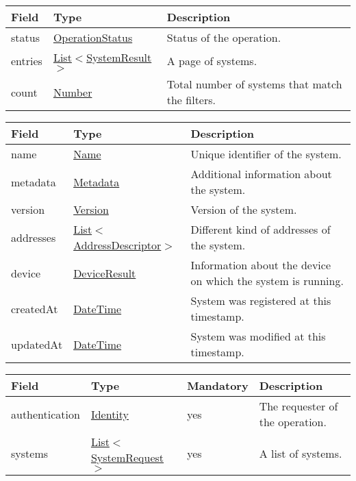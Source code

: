 \documentclass[a4paper]{arrowhead}
\newcommand{\pref}[1]{{\textcolor{ArrowheadGrey}{\hyperref[sec:model:primitives:#1]{#1}}}}
\begin{document}

\begin{table}[H]
\begin{tabularx}{\textwidth}{| p{2.5cm} | p{3.2cm} | X |} \hline
\rowcolor{gray!33} Field & Type      & Description \\ \hline
status & \pref{OperationStatus} & Status of the operation. \\ \hline
entries & \pref{List}$<$\hyperref[sec:model:SystemResult]{SystemResult}$>$ & A page of systems. \\ \hline
count & \pref{Number} & Total number of systems that match the filters. \\ \hline
\end{tabularx}
\end{table}

 
\begin{table}[ht!]
\begin{tabularx}{\textwidth}{| p{2.5cm} | p{4cm} | X |} \hline
\rowcolor{gray!33} Field & Type      & Description \\ \hline
name & \pref{Name} & Unique identifier of the system. \\ \hline
metadata & \hyperref[sec:model:Metadata]{Metadata} & Additional information about the system. \\ \hline
version & \pref{Version} & Version of the system. \\ \hline
addresses &  \pref{List}$<$\hyperref[sec:model:AddressDescriptor]{AddressDescriptor}$>$ & Different kind of addresses of the system.  \\ \hline
device & \hyperref[sec:model:DeviceResult]{DeviceResult} & Information about the device on which the system is running. \\ \hline
createdAt & \pref{DateTime} & System was registered at this timestamp. \\ \hline
updatedAt & \pref{DateTime} & System was modified at this timestamp. \\ \hline
\end{tabularx}
\end{table}

 
\begin{table}[ht!]
\begin{tabularx}{\textwidth}{| p{2.5cm} | p{3.5cm} | p{2cm} | X |} \hline
\rowcolor{gray!33} Field & Type & Mandatory & Description \\ \hline
authentication & \hyperref[sec:model:Identity]{Identity} & yes & The requester of the operation. \\ \hline
systems & \pref{List}$<$\hyperref[sec:model:SystemRequest]{SystemRequest}$>$ & yes & A list of systems. \\ \hline
\end{tabularx}
\end{table}
\end{document}
